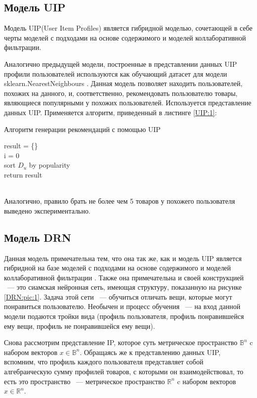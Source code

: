 \documentclass[14pt]{mmcs_article}
\begin{document}
\subsection{Модель UIP}
Модель UIP(User Item Profiles) является гибридной моделью, сочетающей в себе черты моделей с подходами на основе содержимого и моделей коллаборативной фильтрации.

Аналогично предыдущей модели, построенные в представлении данных UIP профили пользователей используются как обучающий датасет для модели sklearn.NearestNeighbours \cite{IP:a1}. Данная модель позволяет находить пользователей, похожих на данного, и, соответственно, рекомендовать пользователю товары, являющиеся популярными у похожих пользователей. Используется представление данных UIP.
Применяется алгоритм, приведенный в листинге \ref{UIP:1}:

\begin{algorithm}[H]\label{UIP:1}
	\caption{Алгоритм генерации рекомендаций с помощью UIP}
	result = \{\} \\
	i = 0 \\
	sort $D_u$ by popularity\\
	return result
\end{algorithm}
\ \\

Аналогично, правило брать не более чем 5 товаров у похожего пользователя выведено экспериментально.
\subsection{Модель DRN}
Данная модель примечательна тем, что она так же, как и модель UIP является гибридной на базе моделей с подходами на основе содержимого и моделей коллаборативной фильтрации \cite{DRN:a1}. Также она примечательна и своей конструкцией ~--- это сиамская нейронная сеть, имеющая структуру, показанную на рисунке \ref{DRN:pic:1}. Задача этой сети ~--- обучиться отличать вещи, которые могут понравиться пользователю. Необычен и процесс обучения ~--- на вход данной модели подаются тройки вида (профиль пользователя, профиль понравившейся ему вещи, профиль не понравившейся ему вещи). 

Снова рассмотрим представление IP, которое суть метрическое пространство $\mathbb{B}^n$ c набором векторов $x \in \mathbb{B}^n$. Обращаясь же к представлению данных UIP, вспомним, что профиль каждого пользователя представляет собой алгебраическую сумму профилей товаров, с которыми он взаимодействовал, то есть это пространство ~--- метрическое пространство $\mathbb{R}^n$ c набором векторов $x \in \mathbb{R}^n$.
\end{document}
